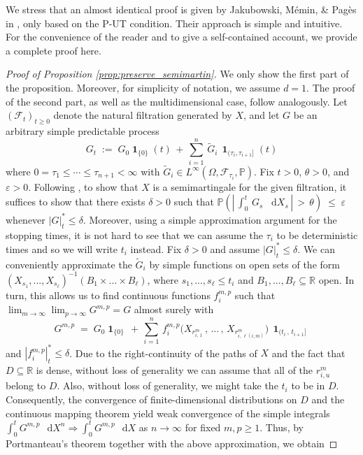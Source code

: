 \documentclass[11pt]{article}
\theoremstyle{definition}\newtheorem{example}[theorem]{Example}
\theoremstyle{definition}\newtheorem{counterexample}[theorem]{Counterexample}
\theoremstyle{definition}\newtheorem{remark}[theorem]{Remark}
\theoremstyle{definition}\newtheorem{defi}[theorem]{Definition}
\numberwithin{equation}{section}
\newcommand{\R}{\mathbb{R}}
\newcommand*\diff{\mathop{}\!\mathrm{d}}								%
\newcommand{\ind}{\operatorname{\mathbf{1}}}							%
\renewcommand{\|}{\; : \, \;}											%
\begin{document}
We stress that an almost identical proof is given by Jakubowski, M\'emin, \& Pag\`es in \cite[Thm.~2.1, Lem.~1.3, \& Lem.~1.1]{jakubowskimeminpages}, only based on the P-UT condition. Their approach is simple and intuitive. For the convenience of the reader and to give a self-contained account, we provide a complete proof here.
\begin{proof}[Proof of Proposition \ref{prop:preserve_semimartin}]
	We only show the first part of the proposition. Moreover, for simplicity of notation, we assume $d=1$. The proof of the second part, as well as the multidimensional case, follow analogously. Let $(\mathcal{{F}}_{t})_{t\geq0}$ denote the natural filtration generated by $X$, and let $G$ be an arbitrary simple predictable process
	\begin{equation}
		G_{t}\; := \; G_{0}\ind_{\{0\}}(t)\, + \, \sum_{i=1}^{n}\, \tilde{G}_{i}\, \ind_{(\tau_{i},\tau_{i+1}]}(t) \label{eq:simple_pred_proc}
	\end{equation}
	where $0=\tau_{1}\leq\cdots\leq \tau_{n+1}<\infty$ with $\tilde{G}_{i}\in L^{\infty}(\Omega,\mathcal{{F}}_{\tau_{i}},\mathbb{{P}})$.
	Fix $t>0$, $\theta>0$, and $\varepsilon>0$. Following \cite[Sect.~1, Ch.2]{protter}, to show that $X$ is
	a semimartingale for the given filtration, it suffices to show that
	there exists $\delta>0$ such that $
	\mathbb{{P}}(|\, \int_{0}^{t}\, G_s \; \diff X_s\, |\, >\, \theta)\; \leq \; \varepsilon$ 
	whenever $|G|^*_t  \leq \delta$. Moreover, using a simple approximation argument for the stopping times, it is not hard to see that we can assume the $\tau_i$ to be deterministic times and so we will write $t_i$ instead. Fix $\delta>0$ and assume $|G|^*_t  \leq \delta$. We can conveniently approximate the $\tilde G_i$ by simple functions on open sets of the form $(X_{s_1},...,X_{s_\ell})^{-1}(B_{1} \times... \times B_\ell)$, where $s_1,...,s_\ell \le t_i$ and $B_1,...,B_\ell \subseteq \R$ open. In turn, this allows us to find continuous functions $f^{m,p}_{i}$ such that $\lim_{m \to \infty} \lim_{p\to \infty} G^{m,p} = G$ almost surely with 
	\[
	G^{m,p}\; = \; G_{0}\ind_{\{0\}}\, + \,\sum_{i=1}^{n}\, f_{i}^{m,p}\bigl(X_{r^m_{i,\, 1}}\, , \, \ldots \, , \, X_{r_{ i,\,\ell(i,m)}^m}\bigr)\, \ind_{(t_{i}\, ,\, t_{i+1}]}
	\]
	and $|f_i^{m,p}|^*_t \le \delta$.
	Due to the right-continuity of the paths of $X$ and the fact that $D\subseteq \R$ is dense, without loss of generality we can assume that all of the $r^{m}_{i,u}$ belong to $D$. Also, without loss of generality, we might take the $t_i$ to be in $D$. Consequently, the convergence of finite-dimensional distributions on $D$ and the continuous mapping theorem yield weak convergence of the simple integrals $\int_{0}^{t} G^{m,p}\, \diff X^n \Rightarrow \int_{0}^{t} G^{m,p}\, \diff X$ as $n\to \infty$ for fixed $m,p\ge 1$. Thus, by Portmanteau's theorem together with the above approximation, we obtain

\end{proof}
\end{document}
